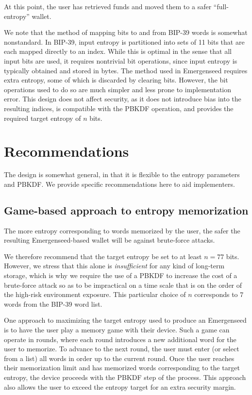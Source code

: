 \documentclass{article}
\begin{document}
At this point, the user has retrieved funds and moved them to a safer ``full-entropy'' wallet.

We note that the method of mapping bits to and from BIP-39 words is somewhat nonstandard.
In BIP-39, input entropy is partitioned into sets of 11 bits that are each mapped directly to an index.
While this is optimal in the sense that all input bits are used, it requires nontrivial bit operations, since input entropy is typically obtained and stored in bytes.
The method used in Emergenseed requires extra entropy, some of which is discarded by clearing bits.
However, the bit operations used to do so are much simpler and less prone to implementation error.
This design does not affect security, as it does not introduce bias into the resulting indices, is compatible with the PBKDF operation, and provides the required target entropy of $n$ bits.


\section{Recommendations}

The design is somewhat general, in that it is flexible to the entropy parameters and PBKDF.
We provide specific recommendations here to aid implementers.


\subsection{Game-based approach to entropy memorization}

The more entropy corresponding to words memorized by the user, the safer the resulting Emergenseed-based wallet will be against brute-force attacks.

We therefore recommend that the target entropy be set to at least $n = 77$ bits.
However, we stress that this alone is \textit{insufficient} for any kind of long-term storage, which is why we require the use of a PBKDF to increase the cost of a brute-force attack so as to be impractical on a time scale that is on the order of the high-risk environment exposure.
This particular choice of $n$ corresponds to $7$ words from the BIP-39 word list.

One approach to maximizing the target entropy used to produce an Emergenseed is to have the user play a memory game with their device.
Such a game can operate in rounds, where each round introduces a new additional word for the user to memorize.
To advance to the next round, the user must enter (or select from a list) all words in order up to the current round.
Once the user reaches their memorization limit and has memorized words corresponding to the target entropy, the device proceeds with the PBKDF step of the process.
This approach also allows the user to exceed the entropy target for an extra security margin.
\end{document}
